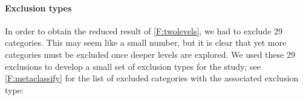 
\vspace{-27\in}

\paragraph*{\textbf{Exclusion types}}

In order to obtain the reduced result of \autoref{F:twolevels}, we had to exclude 29 categories. This may seem like a small number, but it is clear that yet more categories must be excluded once deeper levels are explored. We used these 29 exclusions to develop a small set of exclusion types for the study; see \autoref{F:metaclassify} for the list of excluded categories with the associated exclusion type:

